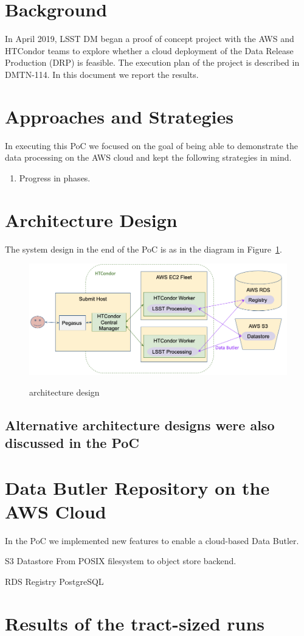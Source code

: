 \section{Background}

In April 2019, LSST DM began a proof of concept project with the AWS and HTCondor teams to explore whether a cloud deployment of the Data Release Production (DRP) is feasible. The execution plan of the project is described in DMTN-114.  In this document we report the results.



\section{Approaches and Strategies}

In executing this PoC we focused on the goal of being able to demonstrate the data processing on the AWS cloud and kept the following strategies in mind.



\begin{enumerate}
\item
Progress in phases.
\end{enumerate}


\section{Architecture Design}

The system design in the end of the PoC is as in the diagram in Figure~\ref{fig:arch}.

\begin{figure}
  \centering
  \includegraphics[width=\textwidth]{figures/arch}
  \label{fig:arch}
  \caption{architecture design}
\end{figure}

\subsection{Alternative architecture designs were also discussed in the PoC}


\section{Data Butler Repository on the AWS Cloud}

In the PoC we implemented new features to enable a cloud-based Data Butler.

S3 Datastore
From POSIX filesystem to object store backend.

RDS Registry
PostgreSQL


\section{Results of the tract-sized runs}
